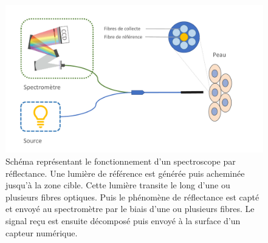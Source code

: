 \begin{figure}[H]
    \centering
    \includegraphics[width=\linewidth]{contents/chapter_2/resources/scheme_principle_spectroscopy.pdf}
    \caption{Schéma représentant le fonctionnement d'un spectroscope par réflectance. Une lumière de référence est générée puis acheminée jusqu'à la zone cible. Cette lumière transite le long d'une ou plusieurs fibres optiques. Puis le phénomène de réflectance est capté et envoyé au spectromètre par le biais d'une ou plusieurs fibres. Le signal reçu est ensuite décomposé puis envoyé à la surface d'un capteur numérique.}
    \label{fig:scheme_principle_spectroscopy}
\end{figure}\par

\addtocounter{footnote}{1}

\addtocounter{footnote}{1}


